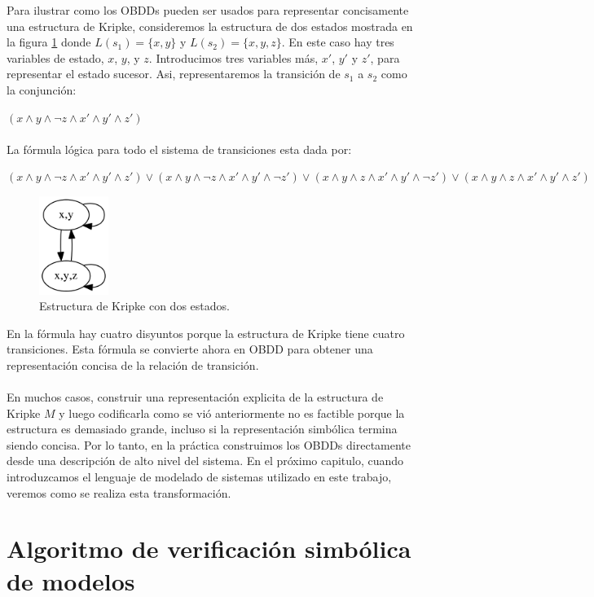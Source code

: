 Para ilustrar como los OBDDs pueden ser usados para representar concisamente una estructura de Kripke, consideremos la estructura de dos estados mostrada en la figura \ref{fig:kripke2} donde $L(s_{1}) = \{x,y\}$ y $L(s_{2}) = \{x,y,z\}$. En este caso hay tres variables de estado, $x$, $y$, y $z$. Introducimos tres variables más, $x'$, $y'$ y $z'$, para representar el estado sucesor. Asi, representaremos la transición de $s_{1}$ a $s_{2}$ como la conjunción:

$(x \land y \land \neg z \land x' \land y' \land z')$\\
\\
La fórmula lógica para todo el sistema de transiciones esta dada por:

$(x \land y \land \neg z \land x' \land y' \land z') \lor (x \land y \land \neg z \land x' \land y' \land \neg z') \lor (x \land y \land z \land x' \land y' \land \neg z') \lor (x \land y \land z \land x' \land y' \land z')$ 
\begin{figure}[H]
  \centering
  \includegraphics[width=0.2\textwidth]{Figures/kripke2.png}
  \caption{Estructura de Kripke con dos estados.}
  \label{fig:kripke2}
\end{figure}

\noindent En la fórmula hay cuatro disyuntos porque la estructura de Kripke tiene cuatro transiciones. Esta fórmula se convierte ahora en OBDD para obtener una representación concisa de la relación de transición.\\
\\
En muchos casos, construir una representación explicita de la estructura de Kripke $M$ y luego codificarla como se vió anteriormente no es factible porque la estructura es demasiado grande, incluso si la representación simbólica termina siendo concisa. Por lo tanto, en la práctica construimos los OBDDs directamente desde una descripción de alto nivel del sistema. En el próximo capitulo, cuando introduzcamos el lenguaje de modelado de sistemas utilizado en este trabajo, veremos como se realiza esta transformación.

\section{Algoritmo de verificación simbólica de modelos}

